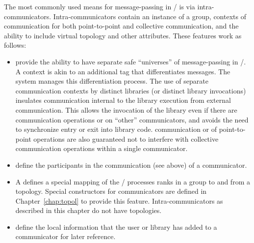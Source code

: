  The most commonly used means for
message-passing in \MPI/ is via intra-communicators. Intra-communicators contain an
instance of a group, contexts of communication for both point-to-point and
collective communication, and the ability to include virtual topology and
other attributes.
These features work as follows:
\begin{itemize}
\item {} provide the ability to have separate safe ``universes''
of message-passing in \MPI/. A context is akin to an additional
tag that differentiates messages.
The system manages this differentiation process.
The use of separate communication
contexts by distinct libraries (or distinct library invocations)
insulates communication internal to the library execution from
external communication. This allows the invocation of the library even if
there are  communication operations
or 
on ``other'' communicators, and avoids the need to
synchronize entry or exit into library code.
 communication
or  of 
point-to-point operations
are also guaranteed not to interfere with
collective communication operations within a single communicator.

\item {} define the participants in the communication (see above)
of a communicator.

\item A  defines a special mapping of the \MPI/ processes ranks in a
  group to and from a topology. Special constructors for
  communicators are defined in Chapter~\ref{chap:topol} to provide
  this feature. Intra-communicators as described in this chapter do
  not have topologies.

\item {} define the local information that the user or
library has added to a communicator for later reference.
\end{itemize}

